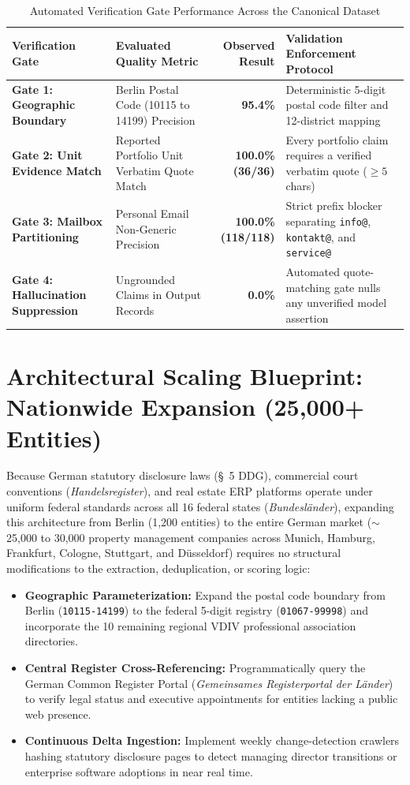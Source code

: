 \documentclass[11pt,a4paper]{article}
\begin{document}
\begin{table}[htbp]
\centering
\caption{Automated Verification Gate Performance Across the Canonical Dataset}
\label{tab:validation}
\footnotesize
\begin{tabularx}{\textwidth}{l l r X}
\toprule
\textbf{Verification Gate} & \textbf{Evaluated Quality Metric} & \textbf{Observed Result} & \textbf{Validation Enforcement Protocol} \\
\midrule
\textbf{Gate 1: Geographic Boundary} & Berlin Postal Code (10115 to 14199) Precision & \textbf{95.4\%} & Deterministic 5-digit postal code filter and 12-district mapping \\
\textbf{Gate 2: Unit Evidence Match} & Reported Portfolio Unit Verbatim Quote Match & \textbf{100.0\% (36/36)} & Every portfolio claim requires a verified verbatim quote ($\ge 5$ chars) \\
\textbf{Gate 3: Mailbox Partitioning} & Personal Email Non-Generic Precision & \textbf{100.0\% (118/118)} & Strict prefix blocker separating \texttt{info@}, \texttt{kontakt@}, and \texttt{service@} \\
\textbf{Gate 4: Hallucination Suppression} & Ungrounded Claims in Output Records & \textbf{0.0\%} & Automated quote-matching gate nulls any unverified model assertion \\
\bottomrule
\end{tabularx}
\end{table}

\section{Architectural Scaling Blueprint: Nationwide Expansion (25,000+ Entities)}
Because German statutory disclosure laws (\S~5 DDG), commercial court conventions (\textit{Handelsregister}), and real estate ERP platforms operate under uniform federal standards across all 16 federal states (\textit{Bundesl\"ander}), expanding this architecture from Berlin (1,200 entities) to the entire German market ($\sim$25,000 to 30,000 property management companies across Munich, Hamburg, Frankfurt, Cologne, Stuttgart, and D\"usseldorf) requires no structural modifications to the extraction, deduplication, or scoring logic:
\begin{itemize}
    \item \textbf{Geographic Parameterization:} Expand the postal code boundary from Berlin (\texttt{10115-14199}) to the federal 5-digit registry (\texttt{01067-99998}) and incorporate the 10 remaining regional VDIV professional association directories.
    \item \textbf{Central Register Cross-Referencing:} Programmatically query the German Common Register Portal (\textit{Gemeinsames Registerportal der L\"ander}) to verify legal status and executive appointments for entities lacking a public web presence.
    \item \textbf{Continuous Delta Ingestion:} Implement weekly change-detection crawlers hashing statutory disclosure pages to detect managing director transitions or enterprise software adoptions in near real time.
\end{itemize}
\end{document}

